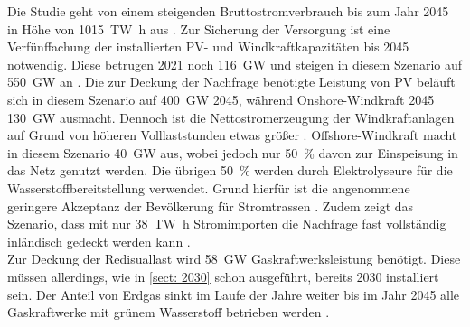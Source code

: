 		Die Studie geht von einem steigenden Bruttostromverbrauch bis zum Jahr 2045 in Höhe von \SI{1015}{\tera\watt\hour} aus \cite[S.10]{ESRa_Fraunhofer}. 
		Zur Sicherung der Versorgung ist eine Verfünffachung der installierten PV- und Windkraftkapazitäten bis 2045 notwendig. 
		Diese betrugen 2021 noch \SI{116}{\giga\watt} und steigen in diesem Szenario auf \SI{550}{\giga\watt} an \cite[S.7]{ESRa_Fraunhofer}.
		Die zur Deckung der Nachfrage benötigte Leistung von PV beläuft sich in diesem Szenario auf \SI{400}{\giga\watt} 2045, während Onshore-Windkraft 2045 \SI{130}{\giga\watt} ausmacht. 
		Dennoch ist die Nettostromerzeugung der Windkraftanlagen auf Grund von höheren Volllaststunden etwas größer \cite[S.7]{ESRa_Fraunhofer}. 
		Offshore-Windkraft macht in diesem Szenario \SI{40}{\giga\watt} aus, wobei jedoch nur \SI{50}{\percent} davon zur Einspeisung in das Netz genutzt werden. 
		Die übrigen \SI{50}{\percent} werden durch Elektrolyseure für die Wasserstoffbereitstellung verwendet. 
		Grund hierfür ist die angenommene geringere Akzeptanz der Bevölkerung für Stromtrassen \cite[S.7]{ESRa_Fraunhofer}. 
		Zudem zeigt das Szenario, dass mit nur \SI{38}{\tera\watt\hour} Stromimporten die Nachfrage fast vollständig inländisch gedeckt werden kann \cite[S.16]{ESRa_Fraunhofer}. \\
		
		Zur Deckung der Redisuallast wird \SI{58}{\giga\watt} Gaskraftwerksleistung benötigt.
		Diese müssen allerdings, wie in \ref{sect: 2030} schon ausgeführt, bereits 2030 installiert sein. 
		Der Anteil von Erdgas sinkt im Laufe der Jahre weiter bis im Jahr 2045 alle Gaskraftwerke mit grünem Wasserstoff betrieben werden \cite[S.8]{ESRa_Fraunhofer}. 
		
